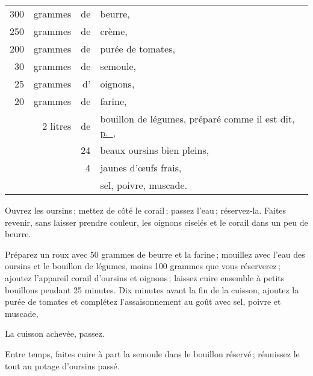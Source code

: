 \footnotesize
\begin{longtable}{rrrp{16em}}                                                    
    300 & grammes  & de & beurre,                                                                         \\
    250 & grammes  & de & crème,                                                                          \\
    200 & grammes  & de & purée de tomates,                                                               \\
     30 & grammes  & de & semoule,                                                                        \\
     25 & grammes  & d' & oignons,                                                                        \\
     20 & grammes  & de & farine,                                                                         \\
        & 2 litres & de & bouillon de légumes, préparé comme il est dit, 
                          \hyperlink{p0211}{p. \pageref{pg0211}},                                         \\
        &          & 24 & beaux oursins bien pleins,                                                      \\
        &          &  4 & jaunes d'œufs frais,                                                            \\
        &          &    & sel, poivre, muscade.                                                           \\
\end{longtable}
\normalsize
               
Ouvrez les oursins ; mettez de côté le corail ; passez l'eau ; réservez-la.
Faites revenir, sans laisser prendre couleur, les oignons ciselés et le corail
dans un peu de beurre.

Préparez un roux avec 50 grammes de beurre et la farine ; mouillez avec l'eau
des oursins et le bouillon de légumes, moins 100 grammes que vous réserverez ;
ajoutez l'appareil corail d'oursins et oignons ; laissez cuire ensemble
à petits bouillons pendant 25 minutes. Dix minutes avant la fin de la cuisson,
ajoutez la purée de tomates et complétez l'assaisonnement au goût avec sel,
poivre et muscade,

La cuisson achevée, passez.

Entre temps, faites cuire à part la semoule dans le bouillon réservé ;
réunissez le tout au potage d'oursins passé.

